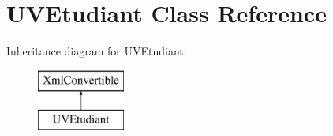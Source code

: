 \hypertarget{classUVEtudiant}{\section{U\+V\+Etudiant Class Reference}
\label{classUVEtudiant}
}
Inheritance diagram for U\+V\+Etudiant\+:\begin{figure}[H]
\begin{center}
\leavevmode
\includegraphics[height=2.000000cm]{classUVEtudiant}
\end{center}
\end{figure}
